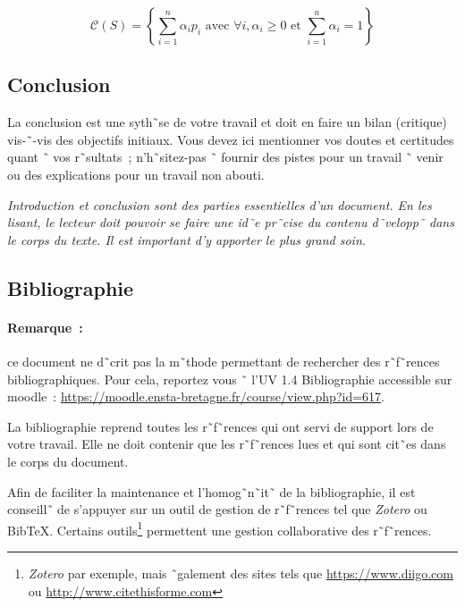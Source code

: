 \begin{equation}
  \label{eq:1}
  \mathcal C(S)=
  \left\{
    \sum_{i=1}^n\alpha_i p_i \mbox{ avec } \forall i, \alpha_i\geqslant 0
    \mbox{ et } \sum_{i=1}^n\alpha_i =  1
  \right\}
\end{equation}

\subsection{Conclusion}

La conclusion est une syth˜se de votre travail et doit en faire un bilan
(critique) vis-˜-vis des 
objectifs initiaux. 
Vous devez ici mentionner vos doutes et certitudes quant ˜
vos r˜sultats~; n'h˜sitez-pas ˜ fournir des pistes pour un travail ˜ venir ou
des explications pour un travail non abouti.


\emph{Introduction et conclusion sont des parties essentielles d'un
  document. En les lisant, le lecteur doit pouvoir se faire une id˜e
  pr˜cise du contenu d˜velopp˜ dans le corps du texte. Il est
  important d'y apporter le plus grand soin.}

\subsection{Bibliographie}

\paragraph{Remarque~:} ce document ne d˜crit pas la m˜thode
permettant de rechercher des r˜f˜rences bibliographiques. Pour cela,
reportez vous ˜ l'UV 1.4 \og{}Bibliographie\fg{} accessible sur moodle~:
\url{https://moodle.ensta-bretagne.fr/course/view.php?id=617}.

La bibliographie reprend toutes les r˜f˜rences qui ont servi de support lors de
votre travail. Elle ne doit contenir que les r˜f˜rences lues et qui sont
cit˜es dans le corps du document.

Afin de faciliter la maintenance et l'homog˜n˜it˜ de la bibliographie, il est
conseill˜ de s'appuyer sur un outil de gestion de r˜f˜rences tel que
\emph{Zotero} ou BibTeX. Certains outils\footnote{\emph{Zotero} par exemple,
  mais ˜galement des sites tels que \url{https://www.diigo.com} ou
  \url{http://www.citethisforme.com}}
permettent une gestion collaborative des r˜f˜rences.


